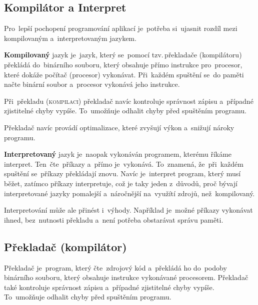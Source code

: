 \documentclass[14pt,a4paper]{article}
\begin{document}
        \subsection{Kompilátor a Interpret}
        Pro~lepší pochopení programování aplikací je~potřeba si~ujasnit rozdíl mezi kompilovaným a~interpretovaným jazykem.

        \textbf{Kompilovaný} jazyk je~jazyk, který se~pomocí tzv.\,překladače (kompilátoru) překládá do~binárního souboru, který obsahuje přímo instrukce pro~procesor, které dokáže počítač (procesor) vykonávat. Při~každém spuštění se~do paměti načte binární soubor a~procesor vykonává jeho instrukce.
        
        Při~překladu (\textsc{kompilaci}) překladač navíc kontroluje správnost zápisu a~případné zjistitelné chyby vypíše. To~umožňuje odhalit chyby před spuštěním programu.

        Překladač navíc provádí optimalizace, které zvyšují výkon a~snižují nároky programu.

        \textbf{Interpretovaný} jazyk je~naopak vykonáván programem, kterému říkáme interpret. Ten~čte~příkazy a~přímo je~vykonává. To~znamená, že~při~každém spuštění se~příkazy překládají znovu. Navíc je~interpret program, který musí běžet, zatímco příkazy interpretuje, což je taky jeden z~důvodů, proč bývají interpretované jazyky pomalejší a~náročnější na~využítí zdrojů, než~kompilovaný.
        
        Interpretování může ale přinést i~výhody. Například je~možné příkazy vykonávat ihned, bez~nutnosti překladu a~není potřeba obstarávat správu paměti. \parencite{ueda:compiled}
        
        \subsection{Překladač (kompilátor)}
        Překladač je~program, který čte~zdrojový kód a~překládá ho do~podoby binárního souboru, který obsahuje instrukce vykonávané procesorem. Překladač také kontroluje správnost zápisu a~případné zjistitelné chyby vypíše. To~umožňuje odhalit chyby před spuštěním programu.
\end{document}
